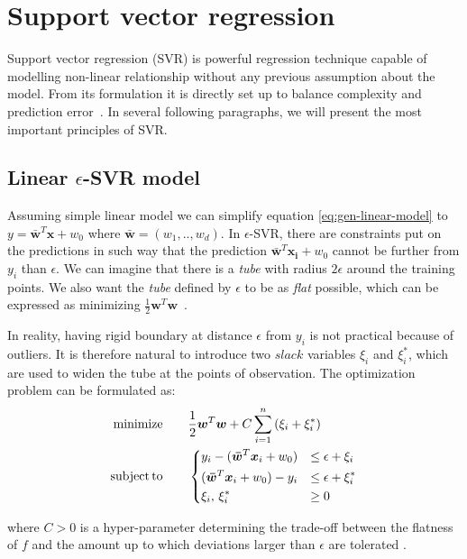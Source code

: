 \section{Support vector regression}
Support vector regression (SVR) is powerful regression technique capable of modelling non-linear relationship without any previous assumption about the model. From its formulation it is directly set up to balance complexity and prediction error~\cite{zhang2020}. In several following paragraphs, we will present the most important principles of SVR.

\subsection*{Linear $\epsilon$-SVR model}
Assuming simple linear model we can simplify equation \ref{eq:gen-linear-model} to $y = \bm{\bar{w}}^T\bm{x} + w_0$ where $\bm{\bar{w}} = (w_1,..,w_d)$. In $\epsilon$-SVR, there are constraints put on the predictions in such way that the prediction $ \bm{\bar{w}}^T\bm{x_i} + w_0$ cannot be further from $y_i$ than $\epsilon$. We can imagine that there is a \textit{tube} with radius $2\epsilon$ around the training points. We also want the \textit{tube} defined by $\epsilon$ to be as \textit{flat} possible, which can be expressed as minimizing $\frac{1}{2} \bm{w}^T\bm{w}$~\cite{zhang2020}.

In reality, having rigid boundary at distance $\epsilon$ from $y_i$ is not practical because of outliers. It is therefore natural to introduce two $slack$ variables $\xi_i$ and $\xi_i^*$, which are used to widen the tube at the points of observation. The optimization problem can be formulated as:
\begin{align}
	\label{eq:svr1}
	\mathrm{minimize}\qquad & \frac{1}{2}\bm{w}^T\bm{w} + C\sum_{i=1}^{n}\left(\xi_i+\xi_i^*\right)  \\
	\mathrm{subject}\,\mathrm{to}\qquad & 
	\begin{dcases} 
		\label{eq:svr2}
		y_i - (\bm{\bar{w}}^T\bm{x}_i + w_0) 	& \leq \epsilon + \xi_i \\ 
		(\bm{\bar{w}}^T\bm{x}_i + w_0) - y_i  & \leq \epsilon + \xi_i^* \\
		           \xi_i,\,\xi_i^*   		& \geq 0 
	\end{dcases}
\end{align}

where $C>0$ is a hyper-parameter determining the trade-off between the flatness of $f$ and the amount up to which deviations larger than
$\epsilon$ are tolerated \cite{smola2004}.

